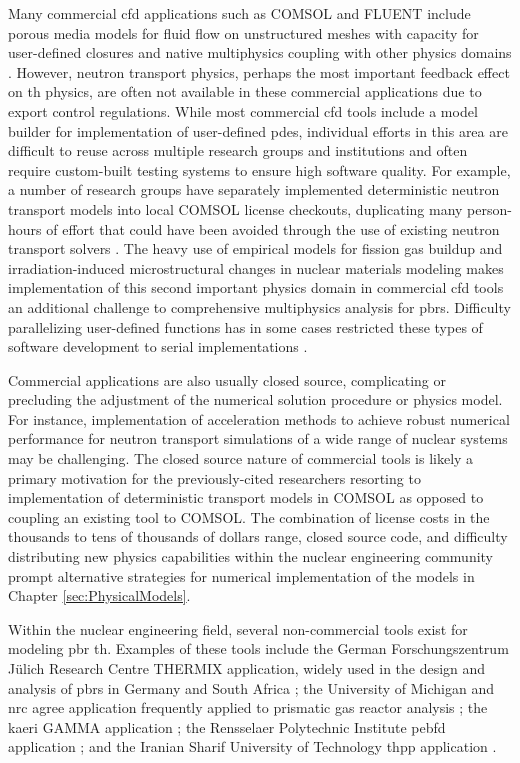 Many commercial \gls{cfd} applications such as COMSOL and FLUENT include porous media models for fluid flow on unstructured meshes with capacity for user-defined closures and native multiphysics coupling with other physics domains \cite{comsol_cfd,fluent}. However, neutron transport physics, perhaps the most important feedback effect on \gls{th} physics, are often not available in these commercial applications due to export control regulations. While most commercial \gls{cfd} tools include a model builder for implementation of user-defined \glspl{pde}, individual efforts in this area are difficult to reuse across multiple research groups and institutions and often require custom-built testing systems to ensure high software quality. For example, a number of research groups have separately implemented deterministic neutron transport models into local COMSOL license checkouts, duplicating many person-hours of effort that could have been avoided through the use of existing neutron transport solvers \cite{xin_wang,hurt,chandler,xoubi,fiorina}. The heavy use of empirical models for fission gas buildup and irradiation-induced microstructural changes in nuclear materials modeling makes implementation of this second important physics domain in commercial \gls{cfd} tools an additional challenge to comprehensive multiphysics analysis for \glspl{pbr}. Difficulty parallelizing user-defined functions has in some cases restricted these types of software development to serial implementations \cite{becker}.

Commercial applications are also usually closed source, complicating or precluding the adjustment of the numerical solution procedure or physics model. For instance, implementation of acceleration methods to achieve robust numerical performance for neutron transport simulations of a wide range of nuclear systems \cite{willert} may be challenging. The closed source nature of commercial tools is likely a primary motivation for the previously-cited researchers resorting to implementation of deterministic transport models in COMSOL as opposed to coupling an existing tool to COMSOL. The combination of license costs in the thousands to tens of thousands of dollars range, closed source code, and difficulty distributing new physics capabilities within the nuclear engineering community prompt alternative strategies for numerical implementation of the models in Chapter \ref{sec:PhysicalModels}.

Within the nuclear engineering field, several non-commercial tools exist for modeling \gls{pbr} \gls{th}. Examples of these tools include the German Forschungszentrum J{\"u}lich Research Centre THERMIX application, widely used in the design and analysis of \glspl{pbr} in Germany and South Africa \cite{gao,tecdoc1163,THERMIX, zwaan}; the University of Michigan and \gls{nrc} \gls{agree} application frequently applied to prismatic gas reactor analysis \cite{seker}; the \gls{kaeri} GAMMA application \cite{lim}; the Rensselaer Polytechnic Institute \gls{pebfd} application \cite{y_li}; and the Iranian Sharif University of Technology \gls{thpp} application \cite{nouri}.

